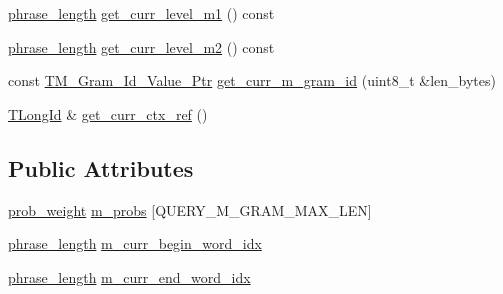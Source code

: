 \begin{DoxyCompactItemize}
\item 
\hyperlink{namespaceuva_1_1smt_1_1bpbd_1_1server_af068a19c2e03116caf3e3827a3e40e35}{phrase\+\_\+length} \hyperlink{classuva_1_1smt_1_1bpbd_1_1server_1_1lm_1_1m__gram__query_aa44b0388dafc0ae509afc20fe9513b4c}{get\+\_\+curr\+\_\+level\+\_\+m1} () const 
\item 
\hyperlink{namespaceuva_1_1smt_1_1bpbd_1_1server_af068a19c2e03116caf3e3827a3e40e35}{phrase\+\_\+length} \hyperlink{classuva_1_1smt_1_1bpbd_1_1server_1_1lm_1_1m__gram__query_a4a27a9e264a36991f59165b9e7d36fb0}{get\+\_\+curr\+\_\+level\+\_\+m2} () const 
\item 
const \hyperlink{namespaceuva_1_1smt_1_1bpbd_1_1server_1_1lm_1_1m__grams_1_1m__gram__id_aa605051ded9336178d905e9581702378}{T\+M\+\_\+\+Gram\+\_\+\+Id\+\_\+\+Value\+\_\+\+Ptr} \hyperlink{classuva_1_1smt_1_1bpbd_1_1server_1_1lm_1_1m__gram__query_aa304f7486426c98beec10400de2a05e6}{get\+\_\+curr\+\_\+m\+\_\+gram\+\_\+id} (uint8\+\_\+t \&len\+\_\+bytes)
\item 
\hyperlink{namespaceuva_1_1smt_1_1bpbd_1_1server_1_1lm_1_1identifiers_a6841847096e455ad3c38689bc548b3b0}{T\+Long\+Id} \& \hyperlink{classuva_1_1smt_1_1bpbd_1_1server_1_1lm_1_1m__gram__query_a857bde04a6aa81703b66ef92b23247d5}{get\+\_\+curr\+\_\+ctx\+\_\+ref} ()
\end{DoxyCompactItemize}
\subsection*{Public Attributes}
\begin{DoxyCompactItemize}
\item 
\hyperlink{namespaceuva_1_1smt_1_1bpbd_1_1server_a01e9ea4de9c226f4464862e84ff0bbcc}{prob\+\_\+weight} \hyperlink{classuva_1_1smt_1_1bpbd_1_1server_1_1lm_1_1m__gram__query_a8dabf6ade4cacbd47cc60ce068e2e2e5}{m\+\_\+probs} \mbox{[}Q\+U\+E\+R\+Y\+\_\+\+M\+\_\+\+G\+R\+A\+M\+\_\+\+M\+A\+X\+\_\+\+L\+E\+N\mbox{]}
\item 
\hyperlink{namespaceuva_1_1smt_1_1bpbd_1_1server_af068a19c2e03116caf3e3827a3e40e35}{phrase\+\_\+length} \hyperlink{classuva_1_1smt_1_1bpbd_1_1server_1_1lm_1_1m__gram__query_a815f6d818cb74cb7577aa2246f0ebf93}{m\+\_\+curr\+\_\+begin\+\_\+word\+\_\+idx}
\item 
\hyperlink{namespaceuva_1_1smt_1_1bpbd_1_1server_af068a19c2e03116caf3e3827a3e40e35}{phrase\+\_\+length} \hyperlink{classuva_1_1smt_1_1bpbd_1_1server_1_1lm_1_1m__gram__query_a42e3f70122bd9679f69633fd18cbe903}{m\+\_\+curr\+\_\+end\+\_\+word\+\_\+idx}
\end{DoxyCompactItemize}
